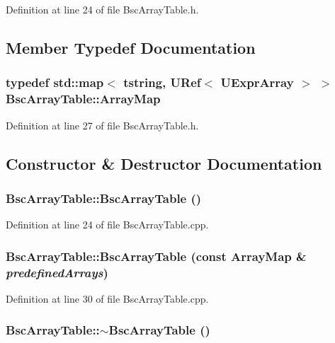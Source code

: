 Definition at line 24 of file BscArrayTable.h.

\subsection{Member Typedef Documentation}
\hypertarget{class_bsc_array_table_ad9ddb45d7f02f4e818990937836f023}{
\subsubsection[{ArrayMap}]{\setlength{\rightskip}{0pt plus 5cm}typedef std::map$<$ {\bf tstring}, {\bf URef}$<$ {\bf UExprArray} $>$ $>$ {\bf BscArrayTable::ArrayMap}}}
\label{class_bsc_array_table_ad9ddb45d7f02f4e818990937836f023}




Definition at line 27 of file BscArrayTable.h.

\subsection{Constructor \& Destructor Documentation}
\hypertarget{class_bsc_array_table_b917923a99d9d67f05d2120768ab4784}{
\subsubsection[{BscArrayTable}]{\setlength{\rightskip}{0pt plus 5cm}BscArrayTable::BscArrayTable ()}}
\label{class_bsc_array_table_b917923a99d9d67f05d2120768ab4784}




Definition at line 24 of file BscArrayTable.cpp.\hypertarget{class_bsc_array_table_43338bfae210ff47eac4ada4e25fd10b}{
\subsubsection[{BscArrayTable}]{\setlength{\rightskip}{0pt plus 5cm}BscArrayTable::BscArrayTable (const {\bf ArrayMap} \& {\em predefinedArrays})}}
\label{class_bsc_array_table_43338bfae210ff47eac4ada4e25fd10b}




Definition at line 30 of file BscArrayTable.cpp.\hypertarget{class_bsc_array_table_d3529b253fbeee28f0bf3f7340341c7c}{
\subsubsection[{$\sim$BscArrayTable}]{\setlength{\rightskip}{0pt plus 5cm}BscArrayTable::$\sim$BscArrayTable ()}}
\label{class_bsc_array_table_d3529b253fbeee28f0bf3f7340341c7c}




